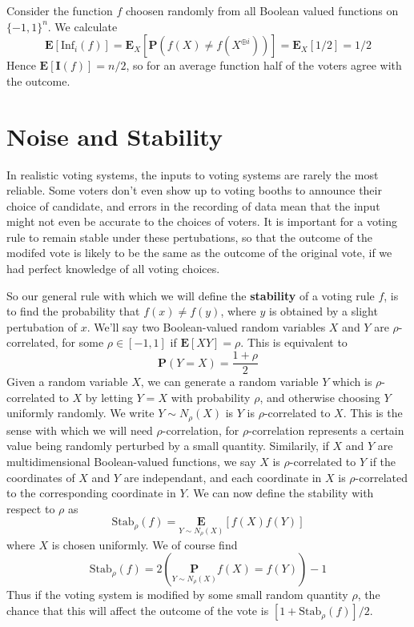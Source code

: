 \begin{example}
    Consider the function $f$ choosen randomly from all Boolean valued functions on $\{ -1, 1 \}^n$. We calculate
    \[ \mathbf{E}[\text{Inf}_i(f)] = \mathbf{E}_X[\mathbf{P}(f(X) \neq f(X^{\oplus i}))] = \mathbf{E}_X[1/2] = 1/2 \]
    Hence $\mathbf{E}[\mathbf{I}(f)] = n/2$, so for an average function half of the voters agree with the outcome.
\end{example}

\section{Noise and Stability}

In realistic voting systems, the inputs to voting systems are rarely the most reliable. Some voters don't even show up to voting booths to announce their choice of candidate, and errors in the recording of data mean that the input might not even be accurate to the choices of voters. It is important for a voting rule to remain stable under these pertubations, so that the outcome of the modifed vote is likely to be the same as the outcome of the original vote, if we had perfect knowledge of all voting choices.

So our general rule with which we will define the {\bf stability} of a voting rule $f$, is to find the probability that $f(x) \neq f(y)$, where $y$ is obtained by a slight pertubation of $x$. We'll say two Boolean-valued random variables $X$ and $Y$ are $\rho$-correlated, for some $\rho \in [-1,1]$ if $\mathbf{E}[XY] = \rho$. This is equivalent to
%
\[ \mathbf{P}(Y = X) = \frac{1 + \rho}{2} \]
%
Given a random variable $X$, we can generate a random variable $Y$ which is $\rho$-correlated to $X$ by letting $Y = X$ with probability $\rho$, and otherwise choosing $Y$ uniformly randomly. We write $Y \sim N_\rho(X)$ is $Y$ is $\rho$-correlated to $X$. This is the sense with which we will need $\rho$-correlation, for $\rho$-correlation represents a certain value being randomly perturbed by a small quantity. Similarily, if $X$ and $Y$ are multidimensional Boolean-valued functions, we say $X$ is $\rho$-correlated to $Y$ if the coordinates of $X$ and $Y$ are independant, and each coordinate in $X$ is $\rho$-correlated to the corresponding coordinate in $Y$. We can now define the stability with respect to $\rho$ as
%
\[ \text{Stab}_\rho(f) = \underset{Y \sim N_\rho(X)}{\mathbf{E}}[f(X)f(Y)] \]
%
where $X$ is chosen uniformly. We of course find
%
\[\text{Stab}_\rho(f) = 2 \left( \underset{Y \sim N_\rho(X)}{\mathbf{P}} f(X) = f(Y)  \right) - 1 \]
%
Thus if the voting system is modified by some small random quantity $\rho$, the chance that this will affect the outcome of the vote is $[1 + \text{Stab}_\rho(f)]/2$.

